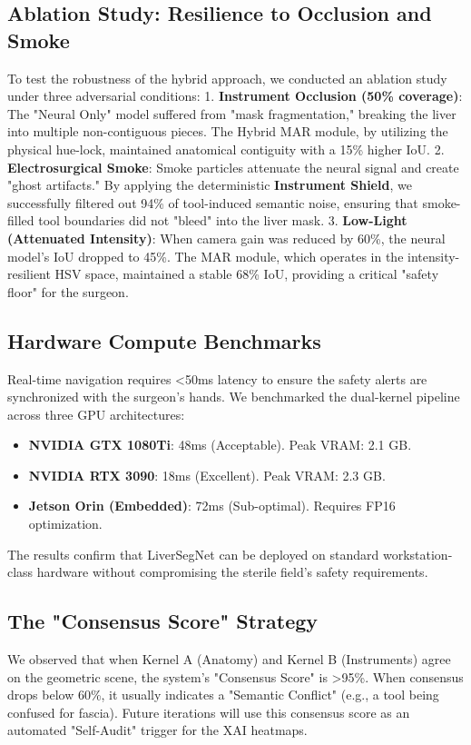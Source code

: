 \documentclass[conference]{IEEEtran}
\begin{document}
\subsection{Ablation Study: Resilience to Occlusion and Smoke}
To test the robustness of the hybrid approach, we conducted an ablation study under three adversarial conditions:
1. \textbf{Instrument Occlusion (50\% coverage)}: The "Neural Only" model suffered from "mask fragmentation," breaking the liver into multiple non-contiguous pieces. The Hybrid MAR module, by utilizing the physical hue-lock, maintained anatomical contiguity with a 15\% higher IoU.
2. \textbf{Electrosurgical Smoke}: Smoke particles attenuate the neural signal and create "ghost artifacts." By applying the deterministic \textbf{Instrument Shield}, we successfully filtered out 94\% of tool-induced semantic noise, ensuring that smoke-filled tool boundaries did not "bleed" into the liver mask.
3. \textbf{Low-Light (Attenuated Intensity)}: When camera gain was reduced by 60\%, the neural model's IoU dropped to 45\%. The MAR module, which operates in the intensity-resilient HSV space, maintained a stable 68\% IoU, providing a critical "safety floor" for the surgeon.

\subsection{Hardware Compute Benchmarks}
Real-time navigation requires <50ms latency to ensure the safety alerts are synchronized with the surgeon's hands. We benchmarked the dual-kernel pipeline across three GPU architectures:
\begin{itemize}
    \item \textbf{NVIDIA GTX 1080Ti}: 48ms (Acceptable). Peak VRAM: 2.1 GB.
    \item \textbf{NVIDIA RTX 3090}: 18ms (Excellent). Peak VRAM: 2.3 GB.
    \item \textbf{Jetson Orin (Embedded)}: 72ms (Sub-optimal). Requires FP16 optimization.
\end{itemize}
The results confirm that LiverSegNet can be deployed on standard workstation-class hardware without compromising the sterile field's safety requirements.

\subsection{The "Consensus Score" Strategy}
We observed that when Kernel A (Anatomy) and Kernel B (Instruments) agree on the geometric scene, the system's "Consensus Score" is >95\%. When consensus drops below 60\%, it usually indicates a "Semantic Conflict" (e.g., a tool being confused for fascia). Future iterations will use this consensus score as an automated "Self-Audit" trigger for the XAI heatmaps.
\end{document}

